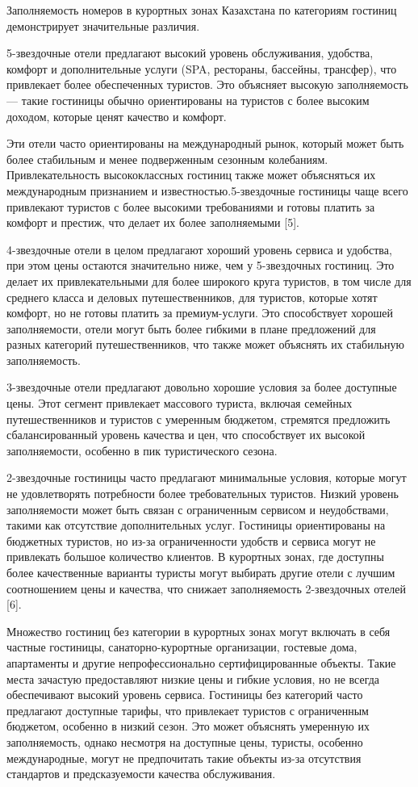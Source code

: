 Заполняемость номеров в курортных зонах Казахстана по категориям
гостиниц демонстрирует значительные различия.

5-звездочные отели предлагают высокий уровень обслуживания, удобства,
комфорт и дополнительные услуги (SPA, рестораны, бассейны, трансфер),
что привлекает более обеспеченных туристов. Это объясняет высокую
заполняемость --- такие гостиницы обычно ориентированы на туристов с
более высоким доходом, которые ценят качество и комфорт.

Эти отели часто ориентированы на международный рынок, который может быть
более стабильным и менее подверженным сезонным колебаниям.
Привлекательность высококлассных гостиниц также может объясняться их
международным признанием и известностью.5-звездочные гостиницы чаще
всего привлекают туристов с более высокими требованиями и готовы платить
за комфорт и престиж, что делает их более заполняемыми {[}5{]}.

4-звездочные отели в целом предлагают хороший уровень сервиса и
удобства, при этом цены остаются значительно ниже, чем у 5-звездочных
гостиниц. Это делает их привлекательными для более широкого круга
туристов, в том числе для среднего класса и деловых путешественников,
для туристов, которые хотят комфорт, но не готовы платить за
премиум-услуги. Это способствует хорошей заполняемости, отели могут быть
более гибкими в плане предложений для разных категорий путешественников,
что также может объяснять их стабильную заполняемость.

3-звездочные отели предлагают довольно хорошие условия за более
доступные цены. Этот сегмент привлекает массового туриста, включая
семейных путешественников и туристов с умеренным бюджетом, стремятся
предложить сбалансированный уровень качества и цен, что способствует их
высокой заполняемости, особенно в пик туристического сезона.

2-звездочные гостиницы часто предлагают минимальные условия, которые
могут не удовлетворять потребности более требовательных туристов. Низкий
уровень заполняемости может быть связан с ограниченным сервисом и
неудобствами, такими как отсутствие дополнительных услуг. Гостиницы
ориентированы на бюджетных туристов, но из-за ограниченности удобств и
сервиса могут не привлекать большое количество клиентов. В курортных
зонах, где доступны более качественные варианты туристы могут выбирать
другие отели с лучшим соотношением цены и качества, что снижает
заполняемость 2-звездочных отелей {[}6{]}.

Множество гостиниц без категории в курортных зонах могут включать в себя
частные гостиницы, санаторно-курортные организации, гостевые дома,
апартаменты и другие непрофессионально сертифицированные объекты. Такие
места зачастую предоставляют низкие цены и гибкие условия, но не всегда
обеспечивают высокий уровень сервиса. Гостиницы без категорий часто
предлагают доступные тарифы, что привлекает туристов с ограниченным
бюджетом, особенно в низкий сезон. Это может объяснять умеренную их
заполняемость, однако несмотря на доступные цены, туристы, особенно
международные, могут не предпочитать такие объекты из-за отсутствия
стандартов и предсказуемости качества обслуживания.

